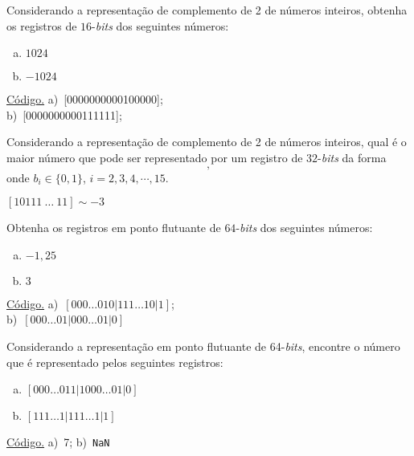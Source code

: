\begin{exer}
  Considerando a representação de complemento de 2 de números inteiros, obtenha os registros de $16$-{\it bits} dos seguintes números:
  \begin{enumerate}[a)]
  \item $1024$
  \item $-1024$
  \end{enumerate}
\end{exer}
\begin{resp}
     \ifisoctave 
    \href{https://github.com/phkonzen/notas/blob/master/src/MatematicaNumerica/cap_aritm/dados/exer_int16/exer_int16.m}{Código.} 
    \fi
    a)~[0000000000100000]; \\
    b)~[0000000000111111];
\end{resp}

\begin{exer}
  Considerando a representação de complemento de 2 de números inteiros, qual é o maior número que pode ser representado por um registro de $32$-{\it bits} da forma
  \begin{equation}
    [1 ~ 0 ~ b_2 ~ b_3 ~ b_4 ~ \cdots ~ b_{30} ~ 1],
  \end{equation}
onde $b_i \in \{0, 1\}$, $i=2, 3, 4, \cdots, 15$.
\end{exer}
\begin{resp}
  $[10111~\ldots~11] \sim -3$
\end{resp}

\begin{exer}
  Obtenha os registros em ponto flutuante de $64$-{\it bits} dos seguintes números:
  \begin{enumerate}[a)]
  \item $-1,25$
  \item $3$
  \end{enumerate}
\end{exer}
\begin{resp}
     \ifisoctave 
    \href{https://github.com/phkonzen/notas/blob/master/src/MatematicaNumerica/cap_aritm/dados/exer_float64/exer_float64.m}{Código.} 
    \fi
    a)~$[000\ldots 0 10|111\ldots 10|1]$;\\
    b)~$[000\ldots 01|000\ldots 01|0]$
\end{resp}

\begin{exer}
  Considerando a representação em ponto flutuante de 64-{\it bits}, encontre o número que é representado pelos seguintes registros:
  \begin{enumerate}[a)]
  \item $[000\ldots 011|1000\ldots 01|0]$
  \item $[111\ldots 1|111\ldots 1|1]$
  \end{enumerate}
\end{exer}
\begin{resp}
     \ifisoctave 
    \href{https://github.com/phkonzen/notas/blob/master/src/MatematicaNumerica/cap_aritm/dados/exer_float2dec/exer_float2dec.m}{Código.} 
    \fi  
    a)~7; b)~\verb+NaN+
\end{resp}

